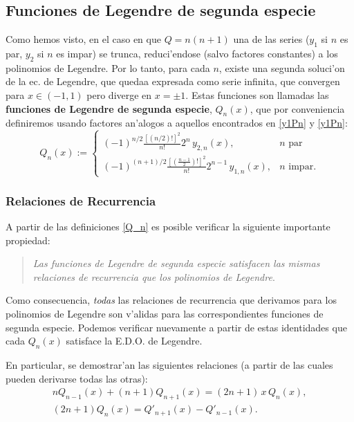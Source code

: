 \subsection{Funciones de Legendre de segunda especie}
Como hemos visto, en el caso en que $Q=n(n+1)$ una de las series ($y_1$ si $n$ es par, $y_2$ si $n$ es impar) se trunca, reduci'endose (salvo factores constantes) a los polinomios de Legendre. Por lo tanto, para cada $n$, existe una segunda soluci'on de la ec. de Legendre, que quedaa expresada como serie infinita, que convergen para $x\in(-1,1)$ pero diverge en $x=\pm 1$. Estas funciones son llamadas las \textbf{funciones de Legendre de segunda especie}, $Q_n(x)$, que por conveniencia definiremos usando factores an'alogos a aquellos encontrados en \eqref{y1Pn} y \eqref{y1Pn}:
\begin{equation}
Q_n(x):=
	\begin{cases}
	(-1)^{n/2}\frac{[(n/2)!]^2}{n!} 2^n\, y_{2,n}(x), & n \text{ par}\\
	(-1)^{(n+1)/2}\frac{\left[\left(\frac{n-1}{2}\right)!\right]^2}{n!}2^{n-1}\, y_{1,n}(x), & n \text{ impar}.
	\end{cases} \label{Q_n}
\end{equation}

\subsubsection{Relaciones de Recurrencia}
A partir de las definiciones \eqref{Q_n} es posible verificar la siguiente importante propiedad: 
\begin{quote}
\textit{Las funciones de Legendre de segunda especie satisfacen las mismas relaciones de recurrencia que los polinomios de Legendre}.
\end{quote} 

Como consecuencia, \textit{todas} las relaciones de recurrencia que derivamos para los polinomios de Legendre son v'alidas para las correspondientes funciones de segunda especie. Podemos verificar nuevamente a partir de estas identidades que cada $Q_n(x)$ satisface la E.D.O. de Legendre.

En particular, se demostrar'an las siguientes relaciones (a partir de las cuales pueden derivarse todas las otras):
\begin{gather}
nQ_{n-1}(x)+(n+1)Q_{n+1}(x)=(2n+1)\,x\,Q_n(x) , \label{nQn-1}\\
(2n+1)Q_n(x)=Q'_{n+1}(x)-Q'_{n-1}(x).
\end{gather}

